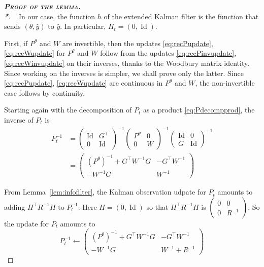 \documentclass[11pt,a4paper]{article}
\newcommand{\thmheadercommand}[1]{\textbf{\scshape{}#1.\\*}}
\def\eps{\varepsilon}
\DeclareMathOperator{\Id}{Id}
\newcommand{\1}{\mathbbm{1}}
\newenvironment{dem}[1][]{\begin{proof}[\thmheadercommand{Proof#1}]~\newline\ignorespaces}{\end{proof}}
\theoremstyle{yannthm}
\theoremstyle{yannthm2}
\newcommand{\transp}[1]{#1^{\!\top}\!}
\newcommand{\Ptheta}{P^\theta}
\numberwithin{equation}{section}
\begin{document}
\begin{dem}[ of the lemma]
In our case, the function $h$ of the extended Kalman filter is the
function that sends $(\theta,\hat y)$ to $\hat y$. In particular,
$H_t=(0,\Id)$.

First, if $\Ptheta$ and $W$ are invertible, then the updates
\eqref{eq:recPupdate}, \eqref{eq:recWupdate} for
$\Ptheta$ and $W$ follow from the updates \eqref{eq:recPinvupdate},
\eqref{eq:recWinvupdate} on their inverses, thanks to
the Woodbury matrix identity. Since working on the inverses is simpler,
we shall prove only the latter. Since \eqref{eq:recPupdate},
\eqref{eq:recWupdate} are continuous in $\Ptheta$ and $W$, the
non-invertible case follows by continuity.%

Starting again with the decomposition of $P_t$ as a product
\eqref{eq:Pdecompprod}, the inverse of $P_t$ is
\begin{align}
P_t^{-1}&=
\begin{pmatrix} \Id & \transp{G}\\0& \Id \end{pmatrix}^{-1}
\begin{pmatrix} \Ptheta &0\\0 &W \end{pmatrix}^{-1}
\begin{pmatrix} \Id & 0\\G &\Id \end{pmatrix}^{-1}
\\&=
\begin{pmatrix}
(\Ptheta)^{-1}+\transp{G}W^{-1}G & -\transp{G} W^{-1}
\\
-W^{-1}G & W^{-1}
\end{pmatrix}
\label{eq:Pinvdecomp}
\end{align}

From Lemma~\ref{lem:infofilter}, the Kalman observation udpate for $P_t$
amounts to adding $\transp{H}R^{-1}H$ to $P_t^{-1}$. Here
$H=(0,\Id)$ so that $\transp{H}R^{-1}H$ is $
\begin{pmatrix}
0 & 0 \\0 & R^{-1}
\end{pmatrix}$. So the update for $P_t$ amounts to
\begin{equation}
\label{eq:Pinvnewdecomp}
P_t^{-1}\gets 
\begin{pmatrix}
(\Ptheta)^{-1}+\transp{G}W^{-1}G & -\transp{G} W^{-1}
\\
-W^{-1}G & W^{-1} + R^{-1}
\end{pmatrix}
\end{equation}


\end{dem}
\end{document}
